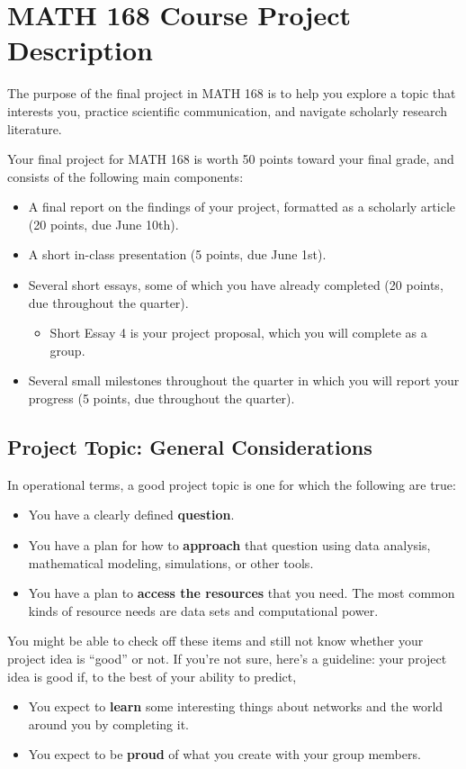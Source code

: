 \documentclass{hw}
\title{}
\author{MATH 168, Spring 2022}
\date{Course Project}
\begin{document}
\section*{MATH 168 Course Project Description}

The purpose of the final project in MATH 168 is to help you explore a topic that interests you, practice scientific communication, and navigate scholarly research literature. 

Your final project for MATH 168 is worth 50 points toward your final grade, and consists of the following main components: 
\begin{itemize}
    \item A final report on the findings of your project, formatted as a scholarly article (20 points, due June 10th). 
    \item A short in-class presentation (5 points, due June 1st). 
    \item Several short essays, some of which you have already completed (20 points, due throughout the quarter). 
    \begin{itemize}
        \item Short Essay 4 is your project proposal, which you will complete as a group.  
    \end{itemize}     
    \item Several small milestones throughout the quarter in which you will report your progress (5 points, due throughout the quarter). 
\end{itemize}

\subsection*{Project Topic: General Considerations}

In operational terms, a good project topic is one for which the following are true: 
\begin{itemize}
    \item You have a clearly defined \textbf{question}. 
    \item You have a plan for how to \textbf{approach} that question using data analysis, mathematical modeling, simulations, or other tools. 
    \item You have a plan to \textbf{access the resources} that you need. 
    The most common kinds of resource needs are data sets and computational power. 
\end{itemize}
You might be able to check off these items and still not know whether your project idea is ``good'' or not. 
If you're not sure, here's a guideline: your project idea is good if, to the best of your ability to predict, 
\begin{itemize}
    \item You expect to \textbf{learn} some interesting things about networks and the world around you by completing it. 
    \item You expect to be \textbf{proud} of what you create with your group members. 
\end{itemize}
\end{document}
